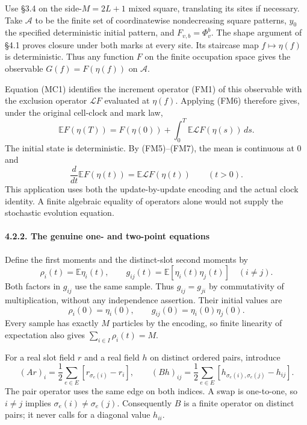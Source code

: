 \documentclass[
  11pt,
  a4paper,
]{article}
\begin{document}
Use §3.4 on the side-\(M=2L+1\) mixed square, translating its sites if
necessary. Take \(\mathcal A\) to be the finite set of coordinatewise
nondecreasing square patterns, \(y_0\) the specified deterministic
initial pattern, and \(F_{v,b}=\Phi_v^b\). The shape argument of §4.1
proves closure under both marks at every site. Its staircase map
\(f\mapsto\eta(f)\) is deterministic. Thus any function \(F\) on the
finite occupation space gives the observable \(G(f)=F(\eta(f))\) on
\(\mathcal A\).

Equation (MC1) identifies the increment operator (FM1) of this
observable with the exclusion operator \(\mathcal LF\) evaluated at
\(\eta(f)\). Applying (FM6) therefore gives, under the original
cell-clock and mark law, \[
\mathbb E F(\eta(T))
=F(\eta(0))+\int_0^T\mathbb E\mathcal LF(\eta(s))\,ds.
\tag{MC6}
\] The initial state is deterministic. By (FM5)--(FM7), the mean is
continuous at \(0\) and \[
\frac d{dt}\mathbb E F(\eta(t))
=\mathbb E\mathcal LF(\eta(t))\qquad(t>0).
\tag{MC7}
\] This application uses both the update-by-update encoding and the
actual clock identity. A finite algebraic equality of operators alone
would not supply the stochastic evolution equation.

\paragraph{4.2.2. The genuine one- and two-point
equations}\label{the-genuine-one--and-two-point-equations}

Define the first moments and the distinct-slot second moments by \[
\rho_i(t)=\mathbb E\eta_i(t),\qquad
g_{ij}(t)=\mathbb E[\eta_i(t)\eta_j(t)]\quad(i\ne j).
\] Both factors in \(g_{ij}\) use the same sample. Thus
\(g_{ij}=g_{ji}\) by commutativity of multiplication, without any
independence assertion. Their initial values are \[
\rho_i(0)=\eta_i(0),\qquad
g_{ij}(0)=\eta_i(0)\eta_j(0).
\tag{MC8}
\] Every sample has exactly \(M\) particles by the encoding, so finite
linearity of expectation also gives \(\sum_{i\in I}\rho_i(t)=M\).

For a real slot field \(r\) and a real field \(h\) on distinct ordered
pairs, introduce \[
(A r)_i=\frac12\sum_{e\in E}[r_{\sigma_e(i)}-r_i],
\qquad
(B h)_{ij}=\frac12\sum_{e\in E}
[h_{\sigma_e(i),\sigma_e(j)}-h_{ij}].
\tag{MC9}
\] The pair operator uses the same edge on both indices. A swap is
one-to-one, so \(i\ne j\) implies \(\sigma_e(i)\ne\sigma_e(j)\).
Consequently \(B\) is a finite operator on distinct pairs; it never
calls for a diagonal value \(h_{ii}\).
\end{document}
